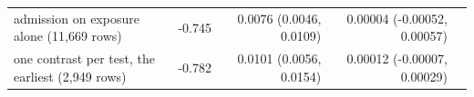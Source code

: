 \begin{tabular}{lrrrrrr}
admission on exposure alone (11,669 rows) & -0.745 &  & 0.0076 (0.0046, 0.0109) &  & 0.00004 (-0.00052, 0.00057) &  \\
one contrast per test, the earliest (2,949 rows) & -0.782 &  & 0.0101 (0.0056, 0.0154) &  & 0.00012 (-0.00007, 0.00029) &  \\
\bottomrule
\end{tabular}
